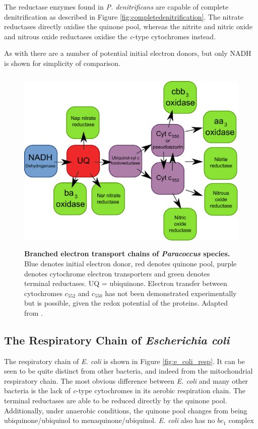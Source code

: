 The reductase enzymes found in \textit{P. denitrificans} are capable of complete denitrification as described in Figure \ref{fig:completedenitrification}. The nitrate reductases directly oxidise the quinone pool, whereas the nitrite and nitric oxide and nitrous oxide reductases oxidise the \textit{c}-type cytochromes instead.

As with \Nm{} there are a number of potential initial electron donors, but only NADH is shown for simplicity of comparison.

\begin{figure}[tbp]
\begin{center}
	\includegraphics[height=9cm]{01-introduction/data/paracoccus_resp.pdf}
	\caption[{Branched electron transport chains of \textit{Paracoccus} species.}]{{\bf Branched electron transport chains of \textit{Paracoccus} species.} Blue denotes initial electron donor, red denotes quinone pool, purple denotes cytochrome electron transporters and green denotes terminal reductases. UQ = ubiquinone. Electron transfer between cytochromes $c_{552}$ and $c_{550}$ has not been demonstrated experimentally but is possible, given the redox potential of the proteins. Adapted from \citet{Baker1998}.
	\label{fig:paracoccus_resp}}
\end{center}
\end{figure}

\subsection{The Respiratory Chain of \textit{Escherichia coli}}
The respiratory chain of \textit{E. coli} is shown in Figure \ref{fig:e_coli_resp}. It can be seen to be quite distinct from other bacteria, and indeed from the mitochondrial respiratory chain. The most obvious difference between \textit{E. coli} and many other bacteria is the lack of \textit{c}-type cytochromes in its aerobic respiration chain. The terminal reductases are able to be reduced directly by the quinone pool. Additionally, under anaerobic conditions, the quinone pool changes from being ubiquinone/ubiquinol to menaquinone/ubiquinol. \textit{E. coli} also has no $bc_1$ complex

